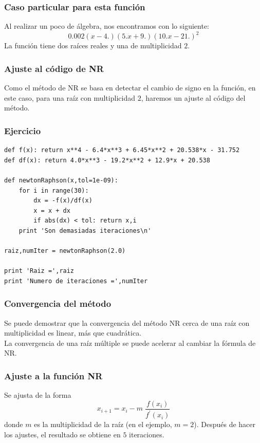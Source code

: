 \begin{frame}
\frametitle{Caso particular para esta función}
Al realizar un poco de álgebra, nos encontramos con lo siguiente:
\[ 0.002 (x - 4.) (5. x + 9.) (10. x - 21.)^{2} \]
La función tiene dos raíces reales y una de multiplicidad $2$.
\end{frame}
\begin{frame}
\frametitle{Ajuste al código de NR}
Como el método de NR se basa en detectar el cambio de signo en la función, en este caso, para una raíz con multiplicidad $2$, haremos un ajuste al código del método.
\end{frame} 	
\begin{frame}
\frametitle{Ejercicio}
\begin{lstlisting}[caption=Código para el ejercicio, style=FormattedNumber, basicstyle=\linespread{1.1}\ttfamily=\small, columns=fullflexible]
def f(x): return x**4 - 6.4*x**3 + 6.45*x**2 + 20.538*x - 31.752
def df(x): return 4.0*x**3 - 19.2*x**2 + 12.9*x + 20.538

def newtonRaphson(x,tol=1e-09):
    for i in range(30):
        dx = -f(x)/df(x)
        x = x + dx
        if abs(dx) < tol: return x,i
    print 'Son demasiadas iteraciones\n'

raiz,numIter = newtonRaphson(2.0)

print 'Raiz =',raiz
print 'Numero de iteraciones =',numIter
\end{lstlisting}
\end{frame}
\begin{frame}
\frametitle{Convergencia del método}
Se puede demostrar que la convergencia del método NR cerca de una raíz con multiplicidad es linear, más que cuadrática.
\\
\bigskip
\pause
La convergencia de una raíz múltiple se puede acelerar al cambiar la fórmula de NR.
\end{frame}
\begin{frame}
\frametitle{Ajuste a la función NR}
Se ajusta de la forma
\[ x_{i + 1} = x_{i} - m \; \dfrac{f(x_{i})}{f^{\prime}(x_{i})} \]
donde $m$ es la multiplicidad de la raíz (en el ejemplo, $m = 2$). Después de hacer los ajustes, el resultado se obtiene en $5$ iteraciones.
\end{frame}

